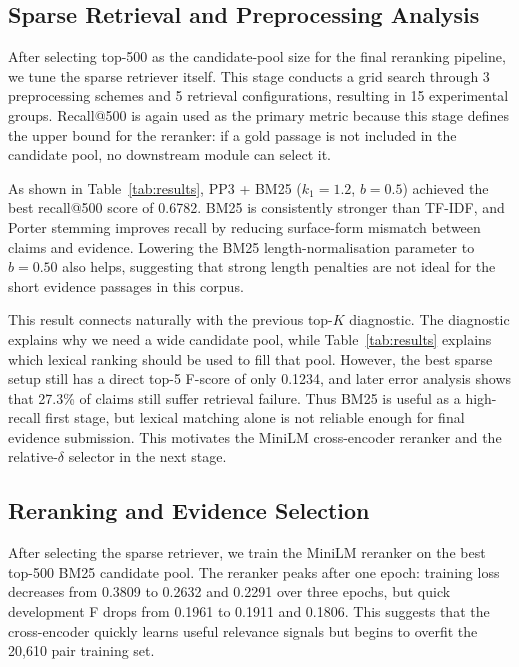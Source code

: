 \documentclass[11pt]{article}
\begin{document}
\subsection{Sparse Retrieval and Preprocessing Analysis}
\label{sec:sparse-retrieval-analysis}
After selecting top-500 as the candidate-pool size for the final reranking pipeline, we tune the sparse retriever itself. This stage conducts a grid search through 3 preprocessing schemes and 5 retrieval configurations, resulting in 15 experimental groups. Recall@500 is again used as the primary metric because this stage defines the upper bound for the reranker: if a gold passage is not included in the candidate pool, no downstream module can select it.

As shown in Table~\ref{tab:results}, PP3 + BM25 ($k_1=1.2$, $b=0.5$) achieved the best recall@500 score of 0.6782. BM25 is consistently stronger than TF-IDF, and Porter stemming improves recall by reducing surface-form mismatch between claims and evidence. Lowering the BM25 length-normalisation parameter to $b=0.50$ also helps, suggesting that strong length penalties are not ideal for the short evidence passages in this corpus.

This result connects naturally with the previous top-$K$ diagnostic. The diagnostic explains why we need a wide candidate pool, while Table~\ref{tab:results} explains which lexical ranking should be used to fill that pool. However, the best sparse setup still has a direct top-5 F-score of only 0.1234, and later error analysis shows that 27.3\% of claims still suffer retrieval failure. Thus BM25 is useful as a high-recall first stage, but lexical matching alone is not reliable enough for final evidence submission. This motivates the MiniLM cross-encoder reranker and the relative-$\delta$ selector in the next stage.

\subsection{Reranking and Evidence Selection}
\label{sec:retrieval-results}

After selecting the sparse retriever, we train the MiniLM reranker on the best top-500 BM25 candidate pool. The reranker peaks after one epoch: training loss decreases from 0.3809 to 0.2632 and 0.2291 over three epochs, but quick development F drops from 0.1961 to 0.1911 and 0.1806. This suggests that the cross-encoder quickly learns useful relevance signals but begins to overfit the 20,610 pair training set.
\end{document}
